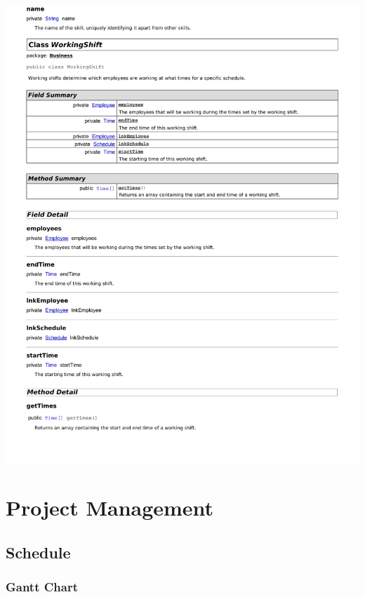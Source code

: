 \documentclass[letterpaper,12pt]{report}
\begin{document}
\newpage
\includegraphics[scale=0.9,trim=20mm 30mm 25mm 8mm]{externals/db12.pdf}
\newpage

\part{Project Management}

\chapter{Schedule}
\section{Gantt Chart}
\end{document}
